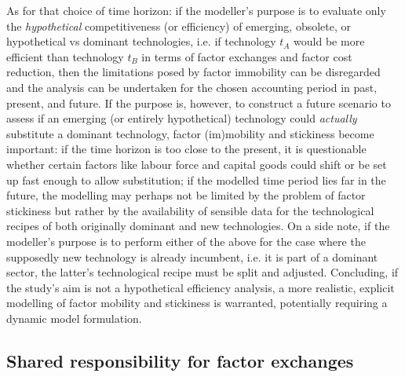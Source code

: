 \documentclass{article}
\begin{document}
\begin{refsection}
As for that choice of time horizon: if the modeller's purpose is to evaluate only the \textit{hypothetical} competitiveness (or efficiency) of emerging, obsolete, or hypothetical vs dominant technologies, i.e. if technology $t_{A}$ would be more efficient than technology $t_{B}$ in terms of factor exchanges and factor cost reduction, then the limitations posed by factor immobility can be disregarded and the analysis can be undertaken for the chosen accounting period in past, present, and future.\footnotemark{} If the purpose is, however, to construct a future scenario to assess if an emerging (or entirely hypothetical) technology could \textit{actually} substitute a dominant technology, factor (im)mobility and stickiness become important: if the time horizon is too close to the present, it is questionable whether certain factors like labour force and capital goods could shift or be set up fast enough to allow substitution; if the modelled time period lies far in the future, the modelling may perhaps not be limited by the problem of factor stickiness but rather by the availability of sensible data for the technological recipes of both originally dominant and new technologies. On a side note, if the modeller's purpose is to perform either of the above for the case where the supposedly new technology is already incumbent, i.e. it is part of a dominant sector, the latter's technological recipe must be split and adjusted. Concluding, if the study's aim is not a hypothetical efficiency analysis, a more realistic, explicit modelling of factor mobility and stickiness is warranted, potentially requiring a dynamic model formulation.


\subsection{Shared responsibility for factor exchanges}


\end{refsection}
\end{document}

